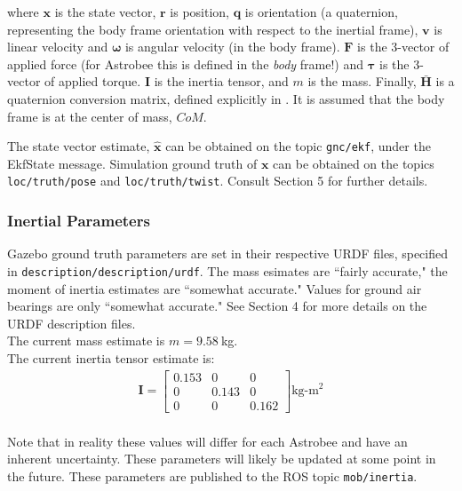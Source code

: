 \documentclass{article}
\begin{document}
\noindent where $\mathbf{x}$ is the state vector, $\mathbf{r}$ is position, $\mathbf{q}$ is orientation (a quaternion, representing the body frame orientation with respect to the inertial frame), $\mathbf{v}$ is linear velocity and $\bm{\omega}$ is angular velocity (in the body frame). $\mathbf{F}$ is the 3-vector of applied force (for Astrobee this is defined in the \textit{body} frame!) and $\bm{\tau}$ is the 3-vector of applied torque. $\mathbf{I}$ is the inertia tensor, and $m$ is the mass. Finally, $\bar{\mathbf{H}}$ is a quaternion conversion matrix, defined explicitly in \cite{Albee2019}. It is assumed that the body frame is at the center of mass, $CoM$.

The state vector estimate, $\mathbf{\hat{x}}$ can be obtained on the topic \texttt{gnc/ekf}, under the EkfState message. Simulation ground truth of $\mathbf{x}$ can be obtained on the topics \texttt{loc/truth/pose} and \texttt{loc/truth/twist}. Consult Section 5 for further details.

\subsubsection{Inertial Parameters}

Gazebo ground truth parameters are set in their respective URDF files, specified in \texttt{description/description/urdf}. The mass esimates are ``fairly accurate," the moment of inertia estimates are ``somewhat accurate." Values for ground air bearings are only ``somewhat accurate." See Section 4 for more details on the URDF description files.
\\

The current mass estimate is $m = 9.58\ $kg.
\\

The current inertia tensor estimate is:
\begin{align*}
    \mathbf{I} =  
    \begin{bmatrix}
              0.153 & 0 & 0\\
              0 & 0.143 & 0\\
              0 & 0 & 0.162
    \end{bmatrix}  \text{kg-m}^2\\
\end{align*}

\noindent Note that in reality these values will differ for each Astrobee and have an inherent uncertainty. These parameters will likely be updated at some point in the future. These parameters are published to the ROS topic \texttt{mob/inertia}.
\end{document}
